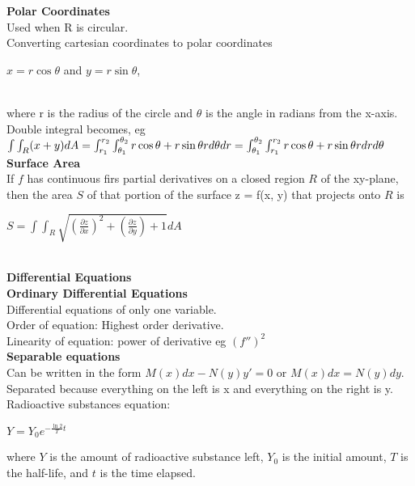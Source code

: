 \documentclass[10pt, a4paper]{article}
\begin{document}
\begin{multicols*}{3}
   	\textbf{Polar Coordinates}\\ 
   	Used when R is circular.\\
   	Converting cartesian coordinates to polar coordinates\\
    \centerline{$x = r\cos{\theta}$ and $y = r\sin{\theta}$,}\\
    where r is the radius of the circle and $\theta$ is the angle in radians from the x-axis.\\
    Double integral becomes, eg\\
    $\int \int_R (x + y) dA = \int_{r_1}^{r_2} \int_{\theta_1}^{\theta_2} r\cos{\theta} + r\sin{\theta} rd\theta dr \\ 
    =  \int_{\theta_1}^{\theta_2} \int_{r_1}^{r_2} r\cos{\theta} + r\sin{\theta} rdrd\theta$\\
    
    \textbf{Surface Area}\\
    If $f$ has continuous firs partial derivatives on a closed region $R$ of the xy-plane, then the area $S$ of that portion of the surface z = f(x, y) that projects onto $R$ is\\
    \centerline{$S = \int\int_R \sqrt{\left(\frac{\partial z}{\partial x}\right)^2 + \left(\frac{\partial z}{\partial y}\right) + 1} dA$}\\
    
    {\normalsize\textbf{Differential Equations}}\\
    
    \textbf{Ordinary Differential Equations}\\
    Differential equations of only one variable.\\
    Order of equation: Highest order derivative.\\
    Linearity of equation: power of derivative eg $(f'')^2$\\
    
    \textbf{Separable equations}\\
    Can be written in the form $M(x)dx - N(y)y' = 0$ or $M(x)dx = N(y)dy$. Separated because everything on the left is x and everything on the right is y. \\
    
    Radioactive substances equation:\\
    \centerline{$Y = Y_0 e^{-\frac{\ln 2}{T}t}$}
    where $Y$ is the amount of radioactive substance left, $Y_0$ is the initial amount, $T$ is the half-life, and $t$ is the time elapsed. \\
    

\end{multicols*}
\end{document}
